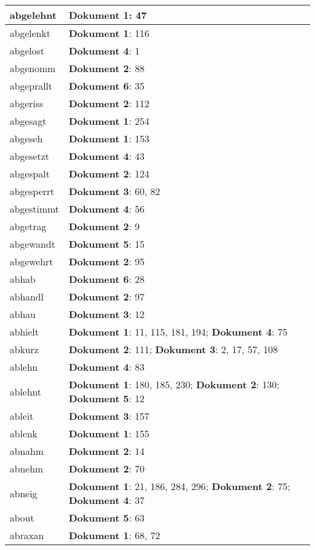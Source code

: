 \documentclass[a5paper]{article}
\begin{document}
\begin{longtable}[l]{|l|p{3in}|}
\hline
abgelehnt & \textbf{Dokument 1}: 47 \\
\hline
abgelenkt & \textbf{Dokument 1}: 116 \\
\hline
abgelost & \textbf{Dokument 4}: 1 \\
\hline
abgenomm & \textbf{Dokument 2}: 88 \\
\hline
abgeprallt & \textbf{Dokument 6}: 35 \\
\hline
abgeriss & \textbf{Dokument 2}: 112 \\
\hline
abgesagt & \textbf{Dokument 1}: 254 \\
\hline
abgeseh & \textbf{Dokument 1}: 153 \\
\hline
abgesetzt & \textbf{Dokument 4}: 43 \\
\hline
abgespalt & \textbf{Dokument 2}: 124 \\
\hline
abgesperrt & \textbf{Dokument 3}: 60, 82 \\
\hline
abgestimmt & \textbf{Dokument 4}: 56 \\
\hline
abgetrag & \textbf{Dokument 2}: 9 \\
\hline
abgewandt & \textbf{Dokument 5}: 15 \\
\hline
abgewehrt & \textbf{Dokument 2}: 95 \\
\hline
abhab & \textbf{Dokument 6}: 28 \\
\hline
abhandl & \textbf{Dokument 2}: 97 \\
\hline
abhau & \textbf{Dokument 3}: 12 \\
\hline
abhielt & \textbf{Dokument 1}: 11, 115, 181, 194; \textbf{Dokument 4}: 75 \\
\hline
abkurz & \textbf{Dokument 2}: 111; \textbf{Dokument 3}: 2, 17, 57, 108 \\
\hline
ablehn & \textbf{Dokument 4}: 83 \\
\hline
ablehnt & \textbf{Dokument 1}: 180, 185, 230; \textbf{Dokument 2}: 130; \textbf{Dokument 5}: 12 \\
\hline
ableit & \textbf{Dokument 3}: 157 \\
\hline
ablenk & \textbf{Dokument 1}: 155 \\
\hline
abnahm & \textbf{Dokument 2}: 14 \\
\hline
abnehm & \textbf{Dokument 2}: 70 \\
\hline
abneig & \textbf{Dokument 1}: 21, 186, 284, 296; \textbf{Dokument 2}: 75; \textbf{Dokument 4}: 37 \\
\hline
about & \textbf{Dokument 5}: 63 \\
\hline
abraxan & \textbf{Dokument 1}: 68, 72 \\

\end{longtable}
\end{document}
